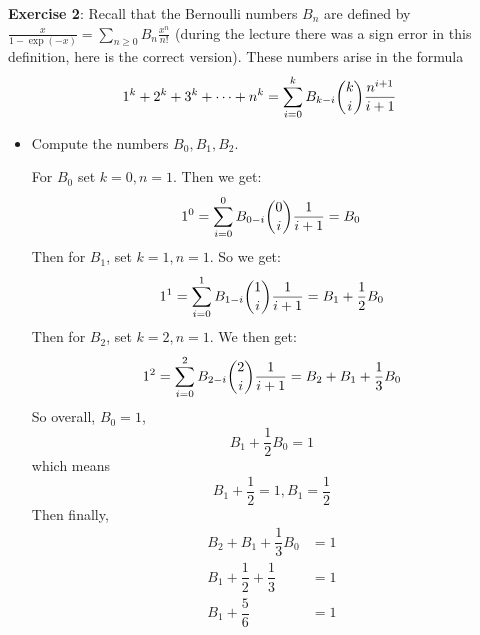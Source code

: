 \documentclass{article}
\begin{document}
\textbf{Exercise 2}: Recall that the Bernoulli numbers $B_{n}$ are defined by $\frac{x}{1 - \exp(-x)} = \sum_{n \geq0}B_{n} \frac{x^{n}}{n!}$ (during the lecture there was a sign error in this definition, here is the correct version).  These numbers arise in the formula
    \begin{equation*}
        1^{k} + 2^{k} + 3^{k} + \cdots + n^{k} = \sum_{i = 0}^{k}B_{k - i}\dbinom{k}{i}\dfrac{n^{i + 1}}{i + 1}
    \end{equation*}
    \begin{itemize}
        \item Compute the numbers $B_{0}, B_{1}, B_{2}$.
            \begin{answer}
                For $B_{0}$ set $k = 0, n = 1$. Then we get:
                    \begin{equation*}
                        1^{0} = \sum_{i = 0}^{0} B_{0 - i}\dbinom{0}{i}\dfrac{1}{i + 1} = B_{0}
                    \end{equation*}
                Then for $B_{1}$, set $k = 1, n = 1$. So we get:
                    \begin{equation*}
                        1^{1} = \sum_{i = 0}^{1}B_{1 - i}\dbinom{1}{i}\dfrac{1}{i + 1} = B_{1} + \dfrac{1}{2}B_{0}
                    \end{equation*}
                Then for $B_{2}$, set $k = 2, n = 1$. We then get:
                    \begin{equation*}
                        1^{2} = \sum_{i = 0}^{2}B_{2 - i}\dbinom{2}{i}\dfrac{1}{i + 1} = B_{2} + B_{1} + \dfrac{1}{3}B_{0}
                    \end{equation*}
                So overall, $B_{0} = 1$, 
                    \begin{equation*}
                        B_{1} + \dfrac{1}{2}B_{0} = 1
                    \end{equation*}
                which means
                    \begin{equation*}
                        B_{1} + \dfrac{1}{2} = 1, B_{1}  = \dfrac{1}{2}
                    \end{equation*}
                Then finally,
                    \begin{align*}
                        B_{2} + B_{1} + \dfrac{1}{3}B_{0}   &= 1            \\
                        B_{1} + \dfrac{1}{2} + \dfrac{1}{3} &= 1            \\
                        B_{1} + \dfrac{5}{6}                &= 1            \\

\end{align*}
\end{answer}
\end{itemize}
\end{document}
